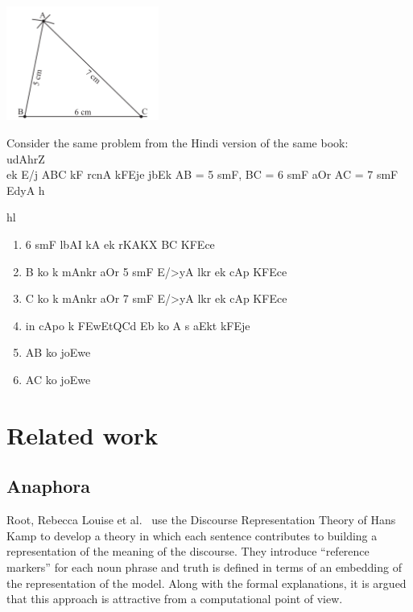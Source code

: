 \def\DevnagVersion{2.15}\documentclass[12pt]{article}
\begin{document}
\begin{center}
\includegraphics[width=5cm]{ncertProblemEnglish}
\end{center}

Consider the same problem from the Hindi version of the same book:\\

{\dn udAhrZ }\\
{\dn ek E/j} ABC {\dn kF rcnA kFEje jbEk} AB = 5 {\dn s\?mF}, BC = 6 {\dn s\?mF} {\dn aOr} AC = 7 {\dn s\?mF} {\dn EdyA h\4}

{\dn hl}
\begin{enumerate}
\item 6 {\dn s\?mF} {\dn l\2bAI kA ek r\?KAK\2X} BC {\dn KF{\qva}Ece}\\
\item B {\dn ko k\?{\qva} mAnkr aOr} 5 {\dn s\?mF} {\dn E/>yA l\?kr ek cAp KF{\qva}Ece}\\
\item C {\dn ko k\?{\qva} mAnkr aOr} 7 {\dn s\?mF} {\dn E/>yA l\?kr ek cAp KF{\qva}Ece}\\
\item {\dn in cApo{\qva} k\? \3FEwEtQC\?d Eb\2 ko} A {\dn s\? a\2Ekt kFEje}\\
\item AB {\dn ko joEwe}\\
\item AC {\dn ko joEwe}\\
\end{enumerate}

\section{Related work}
\subsection{Anaphora}

Root, Rebecca Louise et al.~\cite{root-RL-86-phd-ut_semantics-of-anaphora-in-discourse} use the Discourse Representation Theory of Hans Kamp to develop a theory in which each sentence contributes to building a representation of the meaning of the discourse. They introduce ``reference markers'' for each noun phrase and truth is defined in terms of an embedding of the representation of the model. Along with the formal explanations, it is argued that this approach is attractive from a computational point of view.
\end{document}
